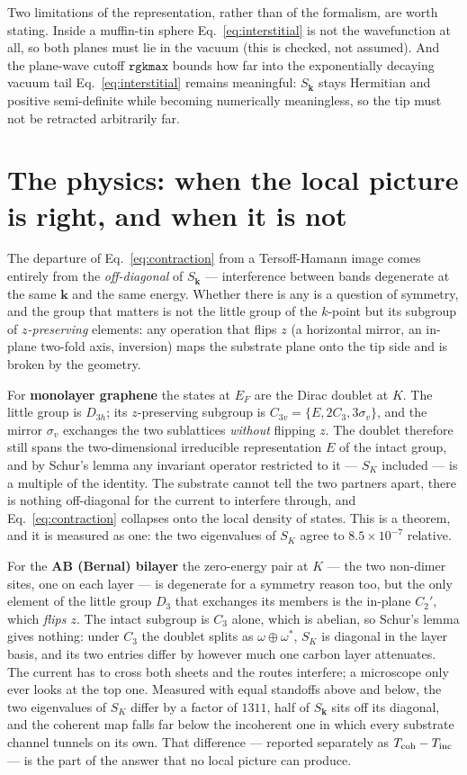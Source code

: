 \documentclass[11pt]{article}
\begin{document}
Two limitations of the representation, rather than of the formalism, are worth
stating. Inside a muffin-tin sphere Eq.~\eqref{eq:interstitial} is not the
wavefunction at all, so both planes must lie in the vacuum (this is checked,
not assumed). And the plane-wave cutoff $\mathtt{rgkmax}$ bounds how far into
the exponentially decaying vacuum tail Eq.~\eqref{eq:interstitial} remains
meaningful: $S_{\mathbf k}$ stays Hermitian and positive semi-definite while
becoming numerically meaningless, so the tip must not be retracted
arbitrarily far.

\section{The physics: when the local picture is right, and when it is not}

The departure of Eq.~\eqref{eq:contraction} from a Tersoff-Hamann image comes
entirely from the \emph{off-diagonal} of $S_{\mathbf k}$ --- interference
between bands degenerate at the same $\mathbf k$ and the same energy. Whether
there is any is a question of symmetry, and the group that matters is not the
little group of the $k$-point but its subgroup of \emph{$z$-preserving}
elements: any operation that flips $z$ (a horizontal mirror, an in-plane
two-fold axis, inversion) maps the substrate plane onto the tip side and is
broken by the geometry.

For \textbf{monolayer graphene} the states at $E_F$ are the Dirac doublet at
$K$. The little group is $D_{3h}$; its $z$-preserving subgroup is
$C_{3v}=\{E,2C_3,3\sigma_v\}$, and the mirror $\sigma_v$ exchanges the two
sublattices \emph{without} flipping $z$. The doublet therefore still spans the
two-dimensional irreducible representation $E$ of the intact group, and by
Schur's lemma any invariant operator restricted to it --- $S_K$ included --- is
a multiple of the identity. The substrate cannot tell the two partners apart,
there is nothing off-diagonal for the current to interfere through, and
Eq.~\eqref{eq:contraction} collapses onto the local density of states. This is
a theorem, and it is measured as one: the two eigenvalues of $S_K$ agree to
$8.5\times10^{-7}$ relative.

For the \textbf{AB (Bernal) bilayer} the zero-energy pair at $K$ --- the two
non-dimer sites, one on each layer --- is degenerate for a symmetry reason
too, but the only element of the little group $D_3$ that exchanges its members
is the in-plane $C_2'$, which \emph{flips $z$}. The intact subgroup is $C_3$
alone, which is abelian, so Schur's lemma gives nothing: under $C_3$ the
doublet splits as $\omega\oplus\omega^*$, $S_K$ is diagonal in the layer basis,
and its two entries differ by however much one carbon layer attenuates. The
current has to cross both sheets and the routes interfere; a microscope only
ever looks at the top one. Measured with equal standoffs above and below, the
two eigenvalues of $S_K$ differ by a factor of $1311$, half of
$S_{\mathbf k}$ sits off its diagonal, and the coherent map falls far below
the incoherent one in which every substrate channel tunnels on its own. That
difference --- reported separately as $T_{\rm coh}-T_{\rm inc}$ --- is the
part of the answer that no local picture can produce.
\end{document}
